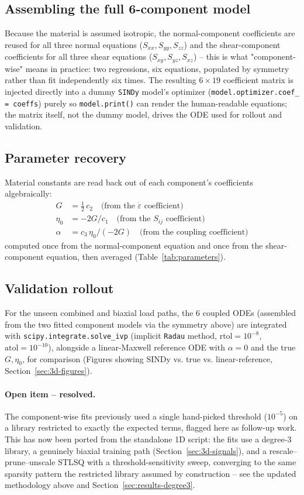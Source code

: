 \documentclass{article}
\begin{document}
\subsection{Assembling the full 6-component model}
Because the material is assumed isotropic, the normal-component coefficients are reused for all three normal equations ($S_{xx}, S_{yy}, S_{zz}$) and the shear-component coefficients for all three shear equations ($S_{xy}, S_{yz}, S_{xz}$) -- this is what "component-wise" means in practice: two regressions, six equations, populated by symmetry rather than fit independently six times. The resulting $6\times 19$ coefficient matrix is injected directly into a dummy \texttt{SINDy} model's optimizer (\texttt{model.optimizer.coef\_ = coeffs}) purely so \texttt{model.print()} can render the human-readable equations; the matrix itself, not the dummy model, drives the ODE used for rollout and validation.

\subsection{Parameter recovery}
Material constants are read back out of each component's coefficients algebraically:
\begin{align*}
    G &= \tfrac{1}{2}\, c_2 \quad \text{(from the } \dot{\varepsilon}\text{ coefficient)} \\
    \eta_0 &= -2G / c_1 \quad \text{(from the } S_{ij}\text{ coefficient)} \\
    \alpha &= c_3 \, \eta_0 / (-2G) \quad \text{(from the coupling coefficient)}
\end{align*}
computed once from the normal-component equation and once from the shear-component equation, then averaged (Table~\ref{tab:parameters}).

\subsection{Validation rollout}
For the unseen combined and biaxial load paths, the 6 coupled ODEs (assembled from the two fitted component models via the symmetry above) are integrated with \texttt{scipy.integrate.solve\_ivp} (implicit \texttt{Radau} method, $\text{rtol}=10^{-8}$, $\text{atol}=10^{-10}$), alongside a linear-Maxwell reference ODE with $\alpha=0$ and the true $G,\eta_0$, for comparison (Figures showing SINDy vs. true vs. linear-reference, Section~\ref{sec:3d-figures}).

\paragraph{Open item -- resolved.} The component-wise fits previously used a single hand-picked threshold ($10^{-5}$) on a library restricted to exactly the expected terms, flagged here as follow-up work. This has now been ported from the standalone 1D script: the fits use a degree-3 library, a genuinely biaxial training path (Section~\ref{sec:3d-signals}), and a rescale--prune--unscale STLSQ with a threshold-sensitivity sweep, converging to the same sparsity pattern the restricted library assumed by construction -- see the updated methodology above and Section~\ref{sec:results-degree3}.
\end{document}
